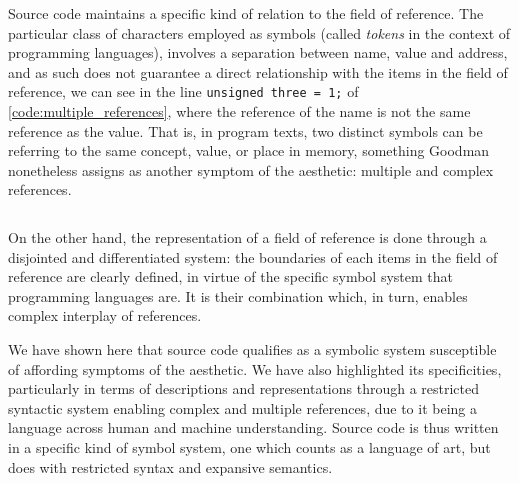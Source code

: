 Source code maintains a specific kind of relation to the field of reference. The particular class of characters employed as symbols (called \emph{tokens} in the context of programming languages), involves a separation between name, value and address, and as such does not guarantee a direct relationship with the items in the field of reference, we can see in the line \lstinline{unsigned three = 1;} of  \autoref{code:multiple_references}, where the reference of the name is not the same reference as the value. That is, in program texts, two distinct symbols can be referring to the same concept, value, or place in memory, something Goodman nonetheless assigns as another symptom of the aesthetic: multiple and complex references.

\begin{listing}
    \inputminted{c}{./corpus/multiple_references.c}
    \caption{\emph{multiple\_references.c} - An example from the Linux kernel showing that the name and the value of a variable might refer to different things. Here, the name of the variables \lstinline{three}, \lstinline{five} and \lstinline{seven} actually refers to the power at which the value is considered when scanning the ext4 filesystem. It iterates through the powers of 3, 5 and 7 and the variables \lstinline{three}, \lstinline{five} and \lstinline{seven} hold the next power of each to consider for the sequence. They could all start at the zeroth power (1 in all cases), but there is no need to consider 1 three times, so it is enough to let three start at 1 and the others at the 1st power (5 and 7).  \citep{linux_fs_2023}.}
    \label{code:multiple_references}
\end{listing}

On the other hand, the representation of a field of reference is done through a disjointed and differentiated system: the boundaries of each items in the field of reference are clearly defined, in virtue of the specific symbol system that programming languages are. It is their combination which, in turn, enables complex interplay of references.

We have shown here that source code qualifies as a symbolic system susceptible of affording symptoms of the aesthetic. We have also highlighted its specificities, particularly in terms of descriptions and representations through a restricted syntactic system enabling complex and multiple references, due to it being a language across human and machine understanding. Source code is thus written in a specific kind of symbol system, one which counts as a language of art, but does with restricted syntax and expansive semantics. 

